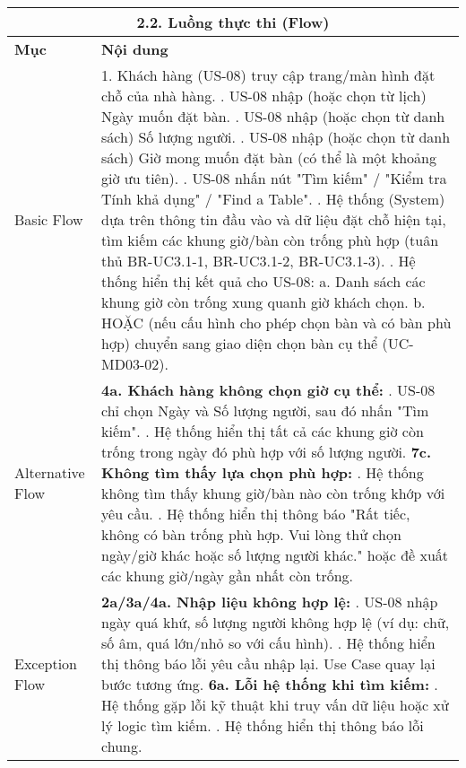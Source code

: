 \begin{longtable}{|m{4cm}|p{11cm}|}
\hline
\multicolumn{2}{|c|}{\textbf{2.2. Luồng thực thi (Flow)}} \\
\hline
\textbf{Mục} & \textbf{Nội dung} \\
\hline
Basic Flow & 1. Khách hàng (US-08) truy cập trang/màn hình đặt chỗ của nhà hàng. \newline 2. US-08 nhập (hoặc chọn từ lịch) Ngày muốn đặt bàn. \newline 3. US-08 nhập (hoặc chọn từ danh sách) Số lượng người. \newline 4. US-08 nhập (hoặc chọn từ danh sách) Giờ mong muốn đặt bàn (có thể là một khoảng giờ ưu tiên). \newline 5. US-08 nhấn nút "Tìm kiếm" / "Kiểm tra Tính khả dụng" / "Find a Table". \newline 6. Hệ thống (System) dựa trên thông tin đầu vào và dữ liệu đặt chỗ hiện tại, tìm kiếm các khung giờ/bàn còn trống phù hợp (tuân thủ BR-UC3.1-1, BR-UC3.1-2, BR-UC3.1-3). \newline 7. Hệ thống hiển thị kết quả cho US-08: \newline    a. Danh sách các khung giờ còn trống xung quanh giờ khách chọn. \newline    b. HOẶC (nếu cấu hình cho phép chọn bàn và có bàn phù hợp) chuyển sang giao diện chọn bàn cụ thể (UC-MD03-02). \\
\hline
Alternative Flow & \textbf{4a. Khách hàng không chọn giờ cụ thể:} \newline    1. US-08 chỉ chọn Ngày và Số lượng người, sau đó nhấn "Tìm kiếm". \newline    2. Hệ thống hiển thị tất cả các khung giờ còn trống trong ngày đó phù hợp với số lượng người. \newline \textbf{7c. Không tìm thấy lựa chọn phù hợp:} \newline    1. Hệ thống không tìm thấy khung giờ/bàn nào còn trống khớp với yêu cầu. \newline    2. Hệ thống hiển thị thông báo "Rất tiếc, không có bàn trống phù hợp. Vui lòng thử chọn ngày/giờ khác hoặc số lượng người khác." hoặc đề xuất các khung giờ/ngày gần nhất còn trống. \\
\hline
Exception Flow & \textbf{2a/3a/4a. Nhập liệu không hợp lệ:} \newline    1. US-08 nhập ngày quá khứ, số lượng người không hợp lệ (ví dụ: chữ, số âm, quá lớn/nhỏ so với cấu hình). \newline    2. Hệ thống hiển thị thông báo lỗi yêu cầu nhập lại. Use Case quay lại bước tương ứng. \newline \textbf{6a. Lỗi hệ thống khi tìm kiếm:} \newline    1. Hệ thống gặp lỗi kỹ thuật khi truy vấn dữ liệu hoặc xử lý logic tìm kiếm. \newline    2. Hệ thống hiển thị thông báo lỗi chung. \\

\end{longtable}

